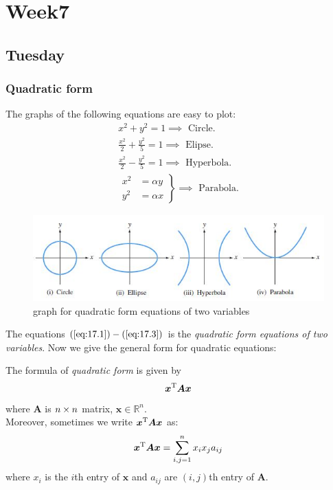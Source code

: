 
\chapter{Week7}

\section{Tuesday}\subsection{Quadratic form}
The graphs of the following equations are easy to plot:
\begin{gather}
x^2+y^2=1\label{eq:17.1}\implies\text{ Circle}.\\
\frac{x^2}{2}+\frac{y^2}{5}=1\label{eq:17.2}\implies\text{ Elipse}.\\
\frac{x^2}{2}-\frac{y^2}{5}=1\label{eq:17.3}\implies\text{ Hyperbola}.\\
\left.\begin{align*}
x^2&=\alpha y\\
y^2&=\alpha x
\end{align*}\right\}\implies\text{ Parabola}.
\end{gather}
\begin{figure}[H]
\centering\includegraphics{week7/shape}
\caption{graph for quadratic form equations of two variables}
\end{figure}
The equations $(\ref{eq:17.1})-(\ref{eq:17.3})$ is the \textit{quadratic form equations of two variables}. Now we give the general form for quadratic equations:
\begin{definition}
The formula of \emph{quadratic form} is given by
\[
\bm x^{\mathrm T}\bm A\bm x
\]
where $\bm A$ is $n\times n$ matrix, $\bm x\in\mathbb{R}^{n}$.\\
Moreover, sometimes we write $\bm x^{\mathrm T}\bm A\bm x$ as:
\[
\bm x^{\mathrm T}\bm A\bm x=\sum_{i,j=1}^{n}x_ix_ja_{ij}
\]
where $x_i$ is the $i$th entry of $\bm x$ and $a_{ij}$ are $(i,j)$th entry of $\bm A$.
\end{definition}
